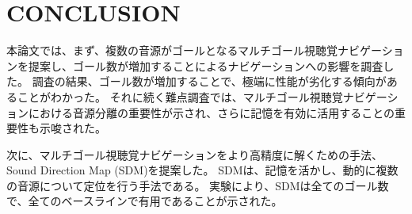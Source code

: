 \section{CONCLUSION}
\label{conclusion}

本論文では、まず、複数の音源がゴールとなるマルチゴール視聴覚ナビゲーションを提案し、ゴール数が増加することによるナビゲーションへの影響を調査した。
調査の結果、ゴール数が増加することで、極端に性能が劣化する傾向があることがわかった。
それに続く難点調査では、マルチゴール視聴覚ナビゲーションにおける音源分離の重要性が示され、さらに記憶を有効に活用することの重要性も示唆された。

次に、マルチゴール視聴覚ナビゲーションをより高精度に解くための手法、Sound Direction Map (SDM)を提案した。
SDMは、記憶を活かし、動的に複数の音源について定位を行う手法である。
実験により、SDMは全てのゴール数で、全てのベースラインで有用であることが示された。
